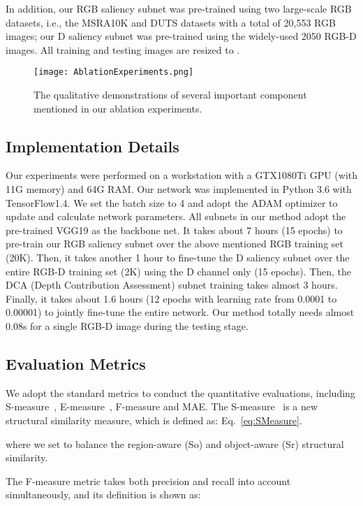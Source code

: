 \documentclass[journal]{IEEEtran}
\begin{document}
In addition, our RGB saliency subnet was pre-trained using two large-scale RGB datasets, i.e., the MSRA10K and DUTS datasets with a total of 20,553 RGB images; our D saliency subnet was pre-trained using the widely-used 2050 RGB-D images.
All training and testing images are resized to .

\begin{figure*}[t]
\centering
\texttt{[image: AblationExperiments.png]}
\caption{The qualitative demonstrations of several important component mentioned in our ablation experiments.}
\label{fig:Ablation Experiments}
\end{figure*}

\subsection{Implementation Details}
Our experiments were performed on a workstation with a GTX1080Ti GPU (with 11G memory) and 64G RAM. Our network was implemented in Python 3.6 with TensorFlow1.4.
We set the batch size to 4 and adopt the ADAM optimizer to update and calculate network parameters.
All subnets in our method adopt the pre-trained VGG19 as the backbone net.
It takes about 7 hours (15 epochs) to pre-train our RGB saliency subnet over the above mentioned RGB training set (20K).
Then, it takes another 1 hour to fine-tune the D saliency subnet over the entire RGB-D training set (2K) using the D channel only (15 epochs).
Then, the DCA (Depth Contribution Assessment) subnet training takes almost 3 hours.
Finally, it takes about 1.6 hours (12 epochs with learning rate from 0.0001 to 0.00001) to jointly fine-tune the entire network.
Our method totally needs almost 0.08s for a single RGB-D image during the testing stage.




\subsection{Evaluation Metrics}
We adopt the standard metrics to conduct the quantitative evaluations, including S-measure~\cite{fan2017structure}, E-measure~\cite{Fan2018Enhanced}, F-measure and MAE.
The S-measure~\cite{fan2017structure} is a new structural similarity measure, which is defined as:
Eq.~\ref{eq:SMeasure}.

where we set  to balance the region-aware (So) and object-aware (Sr) structural similarity.



The F-measure metric takes both precision and recall into account simultaneously, and its definition is shown as:
\end{document}

